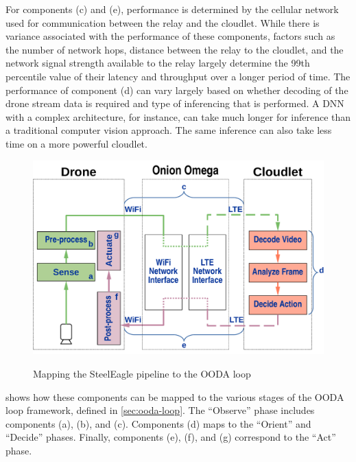 For components (c) and (e), performance is determined by the cellular network
used for communication between the relay and the cloudlet. While there is
variance associated with the performance of these components, factors such as
the number of network hops, distance between the relay to the cloudlet, and the
network signal strength available to the relay largely determine the 99th
percentile value of their latency and throughput over a longer period of time.
The performance of component (d) can vary largely based on whether decoding of
the drone stream data is required and type of inferencing that is performed. A
DNN with a complex architecture, for instance, can take much longer for
inference than a traditional computer vision approach. The same inference can
also take less time on a more powerful cloudlet.

\begin{figure}[htbp]
\centering
\includegraphics[width = .6\textwidth]{figs/fig-ooda-loop.pdf}\\
\caption{Mapping the SteelEagle pipeline to the OODA loop}
\label{fig:ooda-mapping}
\end{figure}

 shows how these components can be mapped to the various
stages of the OODA loop framework, defined in \cref{sec:ooda-loop}. The
``Observe'' phase includes components (a), (b), and (c). Components (d) maps to
the ``Orient'' and ``Decide'' phases. Finally, components (e), (f), and (g)
correspond to the ``Act'' phase.

